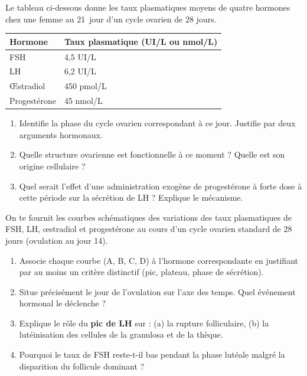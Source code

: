 \documentclass[11pt]{article}
\newcounter{popsec}
\newcounter{popsub}
\newcommand{\courssub}[1]{%
  \stepcounter{popsub}%
  \par\vspace{9pt}\noindent{\popxbold\fontsize{11.5}{13}\selectfont\color{popink}{\color{poporange}\thepopsec.\thepopsub}\hspace{6pt}#1}\par\nopagebreak\vspace{4pt}
}
\begin{document}
\begin{exercice}
Le tableau ci-dessous donne les taux plasmatiques moyens de quatre hormones chez une femme au 21\ieme\ jour d'un cycle ovarien de 28 jours.
\begin{center}
\begin{tabularx}{\linewidth}{|l|X|}\hline
\textbf{Hormone} & \textbf{Taux plasmatique (UI/L ou nmol/L)} \\ \hline
FSH & 4,5 UI/L \\ \hline
LH & 6,2 UI/L \\ \hline
Œstradiol & 450 pmol/L \\ \hline
Progestérone & 45 nmol/L \\ \hline
\end{tabularx}
\end{center}
\begin{enumerate}
    \item Identifie la phase du cycle ovarien correspondant à ce jour. Justifie par deux arguments hormonaux.
    \item Quelle structure ovarienne est fonctionnelle à ce moment ? Quelle est son origine cellulaire ?
    \item Quel serait l'effet d'une administration exogène de progestérone à forte dose à cette période sur la sécrétion de LH ? Explique le mécanisme.
\end{enumerate}
\end{exercice}

\courssub{Je m'entraîne}

\begin{exercice}
On te fournit les courbes schématiques des variations des taux plasmatiques de FSH, LH, œstradiol et progestérone au cours d'un cycle ovarien standard de 28 jours (ovulation au jour 14).
\begin{enumerate}
    \item Associe chaque courbe (A, B, C, D) à l'hormone correspondante en justifiant par au moins un critère distinctif (pic, plateau, phase de sécrétion).
    \item Situe précisément le jour de l'ovulation sur l'axe des temps. Quel événement hormonal le déclenche ?
    \item Explique le rôle du \textbf{pic de LH} sur : (a) la rupture folliculaire, (b) la lutéinisation des cellules de la granulosa et de la thèque.
    \item Pourquoi le taux de FSH reste-t-il bas pendant la phase lutéale malgré la disparition du follicule dominant ?
\end{enumerate}
\end{exercice}
\end{document}
